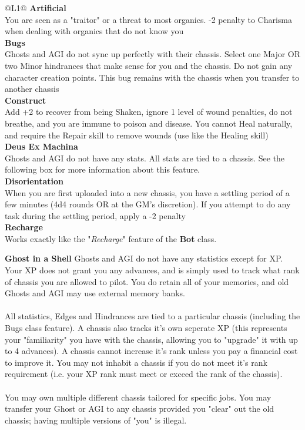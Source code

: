 \begin{redtable}{\linewidth}{@{}L{1}@{}}
  \textbf{Artificial}\\
  You are seen as a "traitor" or a threat to most organics. -2 penalty to Charisma when dealing with organics that do not know you\\
  \textbf{Bugs}\\
  Ghosts and AGI do not sync up perfectly with their chassis. Select one Major OR two Minor hindrances that make sense for you and the chassis. Do not gain any character creation points. This bug remains with the chassis when you transfer to another chassis\\
  \textbf{Construct}\\
  Add +2 to recover from being Shaken, ignore 1 level of wound penalties, do not breathe, and you are immune to poison and disease. You cannot Heal naturally, and require the Repair skill to remove wounds (use like the Healing skill)\\
  \textbf{Deus Ex Machina}\\
  Ghosts and AGI do not have any stats. All stats are tied to a chassis. See the following box for more information about this feature.\\
  \textbf{Disorientation}\\
  When you are first uploaded into a new chassis, you have a settling period of a few minutes (4d4 rounds OR at the GM's discretion). If you attempt to do any task during the settling period, apply a -2 penalty\\
  \textbf{Recharge}\\
  Works exactly like the "\textit{Recharge}" feature of the \textbf{Bot} class.\\
\end{redtable}

\vspace{\baselineskip}

\begin{commentbox}{\textbf{Ghost in a Shell}}
Ghosts and AGI do not have any statistics except for XP. Your XP does not grant you any advances, and is simply used to track what rank of chassis you are allowed to pilot. You do retain all of your memories, and old Ghosts and AGI may use external memory banks.\\
\\
All statistics, Edges and Hindrances are tied to a particular chassis (including the Bugs class feature). A chassis also tracks it's own seperate XP (this represents your "familiarity" you have with the chassis, allowing you to "upgrade" it with up to 4 advances). A chassis cannot increase it's rank unless you pay a financial cost to improve it. You may not inhabit a chassis if you do not meet it's rank requirement (i.e. your XP rank must meet or exceed the rank of the chassis).\\
\\
You may own multiple different chassis tailored for specific jobs. You may transfer your Ghost or AGI to any chassis provided you "clear" out the old chassis; having multiple versions of "you" is illegal. 
\end{commentbox}
  
